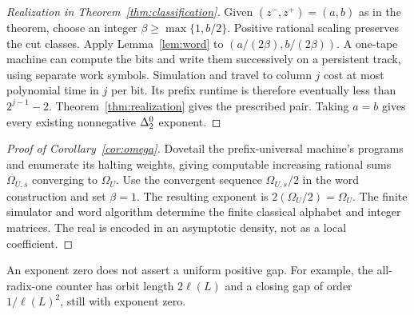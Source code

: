 \begin{proof}[Realization in Theorem~\ref{thm:classification}]
Given $(z^-,z^+)=(a,b)$ as in the theorem, choose an integer
$\beta\geq\max\{1,b/2\}$. Positive rational scaling preserves the cut
classes. Apply Lemma~\ref{lem:word} to $(a/(2\beta),b/(2\beta))$.
A one-tape machine can compute the bits and write them successively on
a persistent track, using separate work symbols. Simulation and travel
to column $j$ cost at most polynomial time in $j$ per bit. Its prefix
runtime is therefore eventually less than $2^{j-1}-2$.
Theorem~\ref{thm:realization} gives the prescribed pair. Taking $a=b$
gives every existing nonnegative $\Delta^0_2$ exponent.
\end{proof}

\begin{proof}[Proof of Corollary~\ref{cor:omega}]
Dovetail the prefix-universal machine's programs and enumerate its halting
weights, giving computable increasing rational sums $\Omega_{U,s}$
converging to $\Omega_U$. Use the convergent sequence
$\Omega_{U,s}/2$ in the word construction and set $\beta=1$.
The resulting exponent is $2(\Omega_U/2)=\Omega_U$. The finite simulator
and word algorithm determine the finite classical alphabet and integer
matrices. The real is encoded in an asymptotic density, not as a local
coefficient.
\end{proof}

An exponent zero does not assert a uniform positive gap. For example,
the all-radix-one counter has orbit length $2\ell(L)$ and a closing
gap of order $1/\ell(L)^2$, still with exponent zero.

